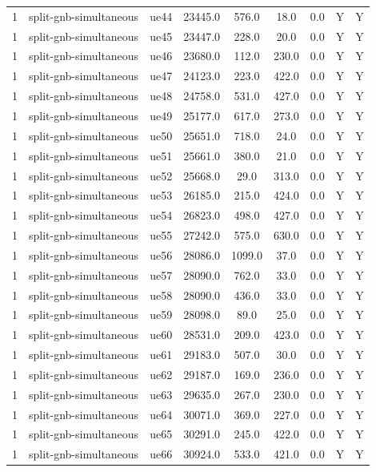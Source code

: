 \begin{table}[ht]
\begin{tabular}{|c|c|c|c|c|c|c|c|c|}
1 & split-gnb-simultaneous & ue44 & 23445.0 & 576.0 & 18.0 & 0.0 & Y & Y \\
1 & split-gnb-simultaneous & ue45 & 23447.0 & 228.0 & 20.0 & 0.0 & Y & Y \\
1 & split-gnb-simultaneous & ue46 & 23680.0 & 112.0 & 230.0 & 0.0 & Y & Y \\
1 & split-gnb-simultaneous & ue47 & 24123.0 & 223.0 & 422.0 & 0.0 & Y & Y \\
1 & split-gnb-simultaneous & ue48 & 24758.0 & 531.0 & 427.0 & 0.0 & Y & Y \\
1 & split-gnb-simultaneous & ue49 & 25177.0 & 617.0 & 273.0 & 0.0 & Y & Y \\
1 & split-gnb-simultaneous & ue50 & 25651.0 & 718.0 & 24.0 & 0.0 & Y & Y \\
1 & split-gnb-simultaneous & ue51 & 25661.0 & 380.0 & 21.0 & 0.0 & Y & Y \\
1 & split-gnb-simultaneous & ue52 & 25668.0 & 29.0 & 313.0 & 0.0 & Y & Y \\
1 & split-gnb-simultaneous & ue53 & 26185.0 & 215.0 & 424.0 & 0.0 & Y & Y \\
1 & split-gnb-simultaneous & ue54 & 26823.0 & 498.0 & 427.0 & 0.0 & Y & Y \\
1 & split-gnb-simultaneous & ue55 & 27242.0 & 575.0 & 630.0 & 0.0 & Y & Y \\
1 & split-gnb-simultaneous & ue56 & 28086.0 & 1099.0 & 37.0 & 0.0 & Y & Y \\
1 & split-gnb-simultaneous & ue57 & 28090.0 & 762.0 & 33.0 & 0.0 & Y & Y \\
1 & split-gnb-simultaneous & ue58 & 28090.0 & 436.0 & 33.0 & 0.0 & Y & Y \\
1 & split-gnb-simultaneous & ue59 & 28098.0 & 89.0 & 25.0 & 0.0 & Y & Y \\
1 & split-gnb-simultaneous & ue60 & 28531.0 & 209.0 & 423.0 & 0.0 & Y & Y \\
1 & split-gnb-simultaneous & ue61 & 29183.0 & 507.0 & 30.0 & 0.0 & Y & Y \\
1 & split-gnb-simultaneous & ue62 & 29187.0 & 169.0 & 236.0 & 0.0 & Y & Y \\
1 & split-gnb-simultaneous & ue63 & 29635.0 & 267.0 & 230.0 & 0.0 & Y & Y \\
1 & split-gnb-simultaneous & ue64 & 30071.0 & 369.0 & 227.0 & 0.0 & Y & Y \\
1 & split-gnb-simultaneous & ue65 & 30291.0 & 245.0 & 422.0 & 0.0 & Y & Y \\
1 & split-gnb-simultaneous & ue66 & 30924.0 & 533.0 & 421.0 & 0.0 & Y & Y \\

\end{tabular}
\end{table}
